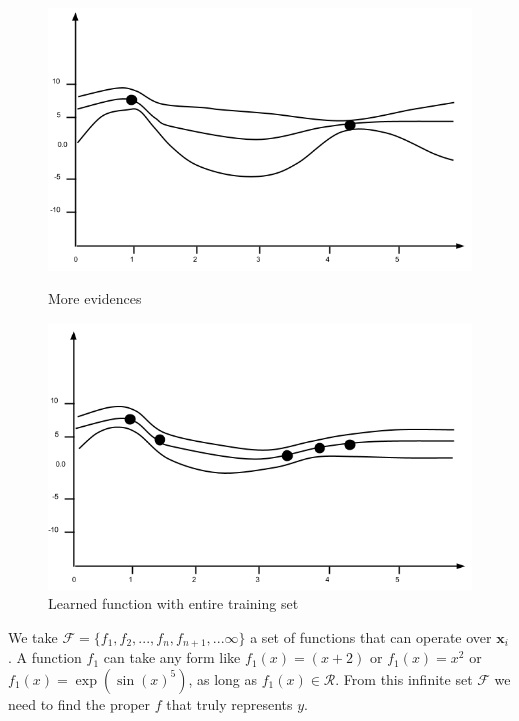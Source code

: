 \documentclass[english]{tktltiki}
\begin{document}
\begin{figure}
\begin{minipage}{.5\linewidth}
  \centering
  \includegraphics[width=\linewidth]{gp_3.png}
  \caption{More evidences}
  \label{fig:sub1}
\end{minipage}%
\begin{minipage}{.5\linewidth}
  \centering
  \includegraphics[width=\linewidth]{gp_4.png}
  \caption{Learned function with entire training set}
  \label{fig:sub2}
\end{minipage}

\label{fig:test}
\end{figure}

We take $\mathcal{F} = \{f_1, f_2, ..., f_n, f_{n+1}, ... \infty\}$ a set of functions that can operate over $\mathbf{x}_i$. A function $f_1$ can take any form like $f_1(x) = (x + 2)$ or $f_1(x) = x^2$ or $f_1(x) = \exp(\sin(x)^5)$, as long as $f_1(x) \in \mathcal{R}$. From this infinite set $\mathcal{F}$ we need to find the proper $f$ that truly represents $y$.
\end{document}
